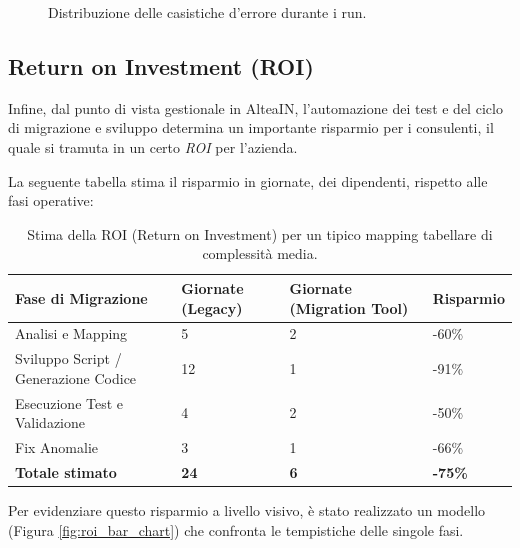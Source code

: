 \begin{figure}[H]
    \centering
    \caption{Distribuzione delle casistiche d'errore durante i run.}
    \label{fig:error_piechart}
\end{figure}

\subsection{Return on Investment (ROI)}\label{subsec:return-on-investment-(roi)}
Infine, dal punto di vista gestionale in AlteaIN, l'automazione dei test e del ciclo di migrazione e sviluppo
determina un importante risparmio per i consulenti, il quale si tramuta in un certo \textit{ROI} per l'azienda.

La seguente tabella stima il risparmio in giornate, dei dipendenti, rispetto alle fasi operative:

\begin{table}[H]
    \centering
    \begin{tabular}{@{} p{} p{} p{} p{} @{}}
        \toprule
        \textbf{Fase di Migrazione} & \textbf{Giornate (Legacy)} & \textbf{Giornate (Migration Tool)} & \textbf{Risparmio} \\
        \midrule
        Analisi e Mapping & 5 & 2 & -60\% \\
        Sviluppo Script / Generazione Codice & 12 & 1 & -91\% \\
        Esecuzione Test e Validazione & 4 & 2 & -50\% \\
        Fix Anomalie & 3 & 1 & -66\% \\
        \midrule
        \textbf{Totale stimato} & \textbf{24} & \textbf{6} & \textbf{-75\%} \\
        \bottomrule
    \end{tabular}
    \caption{Stima della ROI (Return on Investment) per un tipico mapping tabellare di complessità media.}
    \label{tab:roi_estimations}
\end{table}

Per evidenziare questo risparmio a livello visivo, è stato realizzato un modello (Figura \ref{fig:roi_bar_chart}) che 
confronta le tempistiche delle singole fasi. 

